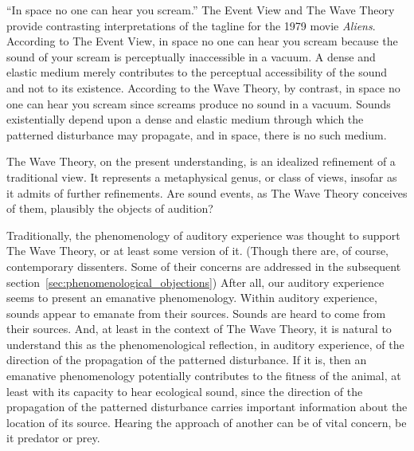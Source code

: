 ``In space no one can hear you scream.'' The Event View and The Wave Theory provide contrasting interpretations of the tagline for the 1979 movie \emph{Aliens}. According to The Event View, in space no one can hear you scream because the sound of your scream is perceptually inaccessible in a vacuum. A dense and elastic medium merely contributes to the perceptual accessibility of the sound and not to its existence. According to the Wave Theory, by contrast, in space no one can hear you scream since screams produce no sound in a vacuum. Sounds existentially depend upon a dense and elastic medium through which the patterned disturbance may propagate, and in space, there is no such medium.

The Wave Theory, on the present understanding, is an idealized refinement of a traditional view. It represents a metaphysical genus, or class of views, insofar as it admits of further refinements. Are sound events, as The Wave Theory conceives of them, plausibly the objects of audition?

Traditionally, the phenomenology of auditory experience was thought to support The Wave Theory, or at least some version of it. (Though there are, of course, contemporary dissenters. Some of their concerns are addressed in the subsequent section~\ref{sec:phenomenological_objections}) After all, our auditory experience seems to present an emanative phenomenology. Within auditory experience, sounds appear to emanate from their sources. Sounds are heard to come from their sources. And, at least in the context of The Wave Theory, it is natural to understand this as the phenomenological reflection, in auditory experience, of the direction of the propagation of the patterned disturbance. If it is, then an emanative phenomenology potentially contributes to the fitness of the animal, at least with its capacity to hear ecological sound, since the direction of the propagation of the patterned disturbance carries important information about the location of its source. Hearing the approach of another can be of vital concern, be it predator or prey.

